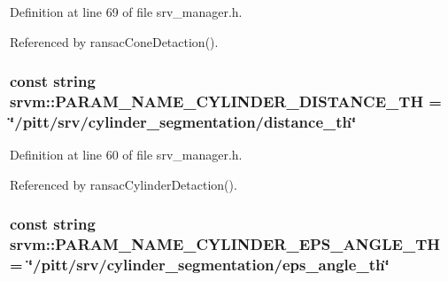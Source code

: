 Definition at line 69 of file srv\-\_\-manager.\-h.



Referenced by ransac\-Cone\-Detaction().

\hypertarget{namespacesrvm_a5c4d574f82749332080a69b24f701293}{
\subsubsection[{P\-A\-R\-A\-M\-\_\-\-N\-A\-M\-E\-\_\-\-C\-Y\-L\-I\-N\-D\-E\-R\-\_\-\-D\-I\-S\-T\-A\-N\-C\-E\-\_\-\-T\-H}]{\setlength{\rightskip}{0pt plus 5cm}const string srvm\-::\-P\-A\-R\-A\-M\-\_\-\-N\-A\-M\-E\-\_\-\-C\-Y\-L\-I\-N\-D\-E\-R\-\_\-\-D\-I\-S\-T\-A\-N\-C\-E\-\_\-\-T\-H = \char`\"{}/pitt/srv/cylinder\-\_\-segmentation/distance\-\_\-th\char`\"{}}}\label{namespacesrvm_a5c4d574f82749332080a69b24f701293}


Definition at line 60 of file srv\-\_\-manager.\-h.



Referenced by ransac\-Cylinder\-Detaction().

\hypertarget{namespacesrvm_a7e9ad3e08d4a3bca5694b38a5fb4a3f7}{
\subsubsection[{P\-A\-R\-A\-M\-\_\-\-N\-A\-M\-E\-\_\-\-C\-Y\-L\-I\-N\-D\-E\-R\-\_\-\-E\-P\-S\-\_\-\-A\-N\-G\-L\-E\-\_\-\-T\-H}]{\setlength{\rightskip}{0pt plus 5cm}const string srvm\-::\-P\-A\-R\-A\-M\-\_\-\-N\-A\-M\-E\-\_\-\-C\-Y\-L\-I\-N\-D\-E\-R\-\_\-\-E\-P\-S\-\_\-\-A\-N\-G\-L\-E\-\_\-\-T\-H = \char`\"{}/pitt/srv/cylinder\-\_\-segmentation/eps\-\_\-angle\-\_\-th\char`\"{}}}\label{namespacesrvm_a7e9ad3e08d4a3bca5694b38a5fb4a3f7}


